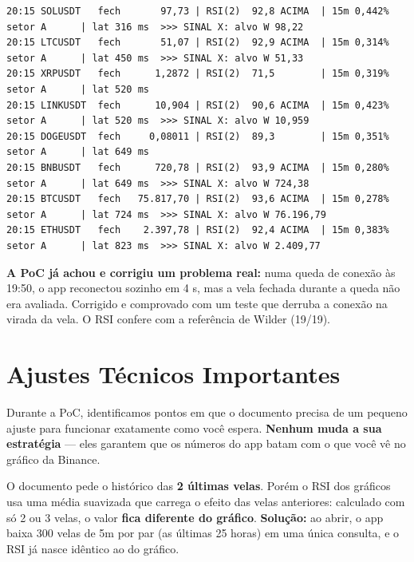\documentclass[11pt,a4paper]{article}
\begin{document}
\begin{tcolorbox}[terminal]
\begin{Verbatim}[breaklines=false]
20:15 SOLUSDT   fech       97,73 | RSI(2)  92,8 ACIMA  | 15m 0,442% setor A      | lat 316 ms  >>> SINAL X: alvo W 98,22
20:15 LTCUSDT   fech       51,07 | RSI(2)  92,9 ACIMA  | 15m 0,314% setor A      | lat 450 ms  >>> SINAL X: alvo W 51,33
20:15 XRPUSDT   fech      1,2872 | RSI(2)  71,5        | 15m 0,319% setor A      | lat 520 ms
20:15 LINKUSDT  fech      10,904 | RSI(2)  90,6 ACIMA  | 15m 0,423% setor A      | lat 520 ms  >>> SINAL X: alvo W 10,959
20:15 DOGEUSDT  fech     0,08011 | RSI(2)  89,3        | 15m 0,351% setor A      | lat 649 ms
20:15 BNBUSDT   fech      720,78 | RSI(2)  93,9 ACIMA  | 15m 0,280% setor A      | lat 649 ms  >>> SINAL X: alvo W 724,38
20:15 BTCUSDT   fech   75.817,70 | RSI(2)  93,6 ACIMA  | 15m 0,278% setor A      | lat 724 ms  >>> SINAL X: alvo W 76.196,79
20:15 ETHUSDT   fech    2.397,78 | RSI(2)  92,4 ACIMA  | 15m 0,383% setor A      | lat 823 ms  >>> SINAL X: alvo W 2.409,77
\end{Verbatim}
\end{tcolorbox}

\begin{tcolorbox}[cyanbox]
  \small\textbf{A PoC já achou e corrigiu um problema real:} numa queda de conexão às 19:50, o app
  reconectou sozinho em 4 s, mas a vela fechada durante a queda não era avaliada. Corrigido e comprovado
  com um teste que derruba a conexão na virada da vela. O RSI confere com a referência de Wilder (19/19).
\end{tcolorbox}

\section{Ajustes Técnicos Importantes}

Durante a PoC, identificamos pontos em que o documento precisa de um pequeno ajuste para
funcionar exatamente como você espera. \textbf{Nenhum muda a sua estratégia} --- eles garantem
que os números do app batam com o que você vê no gráfico da Binance.

\begin{tcolorbox}[ajuste, title={4.1 \enspace RSI de 2 períodos precisa de mais do que 2 velas}]
  \small O documento pede o histórico das \textbf{2 últimas velas}. Porém o RSI dos gráficos usa uma
  média suavizada que carrega o efeito das velas anteriores: calculado com só 2 ou 3 velas, o valor
  \textbf{fica diferente do gráfico}. \textbf{Solução:} ao abrir, o app baixa 300 velas de 5m por par
  (as últimas 25 horas) em uma única consulta, e o RSI já nasce idêntico ao do gráfico.
\end{tcolorbox}
\end{document}
